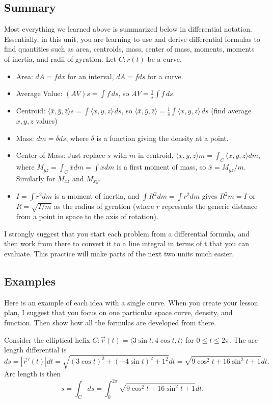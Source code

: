 \subsection{Summary}
Most everything we learned above is summarized below in differential
notation.  Essentially, in this unit, you are learning to
use and derive differential formulas to find quantities such as area,
centroids, mass, center of mass, moments, moments of
inertia, and radii of gyration.  Let $C\colon r(t)$ be a curve.
\begin{itemize}
\item Area: $dA = fdx$ for an interval, $dA=fds $ for a curve.
\item Average Value: $(AV) s = \int f \,ds$, so $AV=\frac 1 s \int f\,ds$.
\item Centroid: $\langle\bar x,\bar y,\bar z\rangle s =\int
\langle x,y,z\rangle\, ds$, so $\langle\bar x,\bar y,\bar z\rangle= \frac 1 s \int \langle x,y,z\rangle\,ds$ (find average $x,y,z$ values)
\item Mass: $dm = \delta ds $, where $\delta$ is a function giving the density at a point.
\item Center of Mass: Just replace $s$ with $m$ in centroid,
$\langle\bar x,\bar y,\bar z\rangle m = \int_C \langle x,y,z\rangle dm$,
where $M_{yz}=\int_C \bar x dm = \int x dm$ is a first moment of mass, so $\bar x = M_{yz}/m$.  Similarly for $M_{xz}$ and $M_{xy}$.
\item $I = \int r^2 dm$ is a moment of inertia, and $\int R^2 dm = \int r^2 dm$
gives $R^2 m =I$ or $R=\sqrt{I/m}$ as the radius of gyration (where
$r$ represents the generic distance from a point in space to the axis
of rotation).
\end{itemize}
I strongly suggest that you start each problem from a differential
formula, and then work from there to convert it to a line integral in
terms of t that you can evaluate.  This practice will make parts of
the next two units much easier.


\subsection{Examples}
Here is an example of each idea with a single curve. When you create
your lesson plan, I suggest that you focus on one particular space
curve, density, and function.  Then show how all the formulas are
developed from there.

Consider the elliptical helix $C\colon\vec r (t) = \langle3\sin t, 4\cos t,
t\rangle$ for $0\leq t\leq 2\pi$.  The arc length differential is $$ds = |\vec
r'(t)|dt = \sqrt{(3\cos t)^2 + (-4\sin t)^2+1^2}dt = \sqrt{9\cos^2
t+16\sin^2 t+1}dt.$$ Arc length is then  $$s=\int_C ds =
\int_{0}^{2\pi}\sqrt{9\cos^2 t+16\sin^2 t+1}dt.$$

